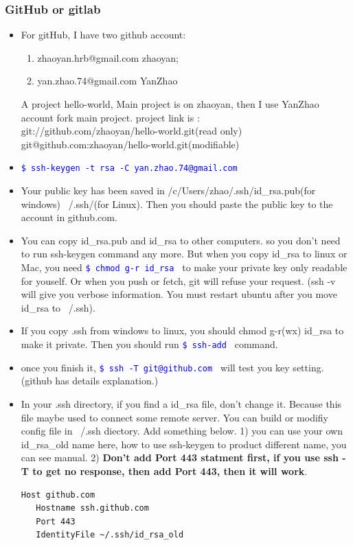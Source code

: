 \documentclass[a4paper,11pt,twoside]{book}
\newcommand{\linuxcommand}[1]{\texttt{\textcolor{blue}{\$ #1 \Pisymbol{psy}{191}}}}
\begin{document}
\subsubsection{GitHub or gitlab}
\begin{itemize}
\item For gitHub, I have two github account:
\begin{enumerate}
  \item zhaoyan.hrb@gmail.com  zhaoyan;
  \item yan.zhao.74@gmail.com YanZhao
\end{enumerate}
A project hello-world, Main project is on zhaoyan, then I use YanZhao account fork main project. project link is : \\
git://github.com/zhaoyan/hello-world.git(read only) \\
git@github.com:zhaoyan/hello-world.git(modifiable)


\item \linuxcommand{ssh-keygen -t rsa -C yan.zhao.74@gmail.com} 

\item Your public key has been saved in /c/Users/zhao/.ssh/id\_rsa.pub(for windows) ~/.ssh/(for Linux). Then you should paste the public key to the account in github.com.  
        	
\item You can copy id\_rsa.pub and id\_rsa to other computers. so you don't need to run ssh-keygen command any more. But when you copy id\_rsa to linux or Mac, you need \linuxcommand{chmod g-r id\_rsa} to make your private key only readable for youself. Or when you push or fetch, git will refuse your request.  (ssh -v will give you verbose information. You must restart ubuntu after you move id\_rsa to ~/.ssh).


\item If you copy .ssh from windows to linux, you should chmod g-r(wx) id\_rsa to make it private. Then you should run \linuxcommand{ssh-add} command. 


\item once you finish it, \linuxcommand{ssh -T git@github.com} will test you key setting. (github has details explanation.)

\item In your .ssh directory, if you find a id\_rsa file, don't change it. Because this file maybe used to connect some remote server. You can build or modifiy config file in ~/.ssh diectory. Add something below. 1) you can use your own id\_rsa\_old name here, how to use ssh-keygen to product different name, you can see manual. 2) \textbf{Don't add Port 443 statment first, if you use ssh -T to get no response, then add Port 443, then it will work}.
\begin{verbatim}
Host github.com
   Hostname ssh.github.com
   Port 443
   IdentityFile ~/.ssh/id_rsa_old
\end{verbatim}


\end{itemize}
\end{document}
